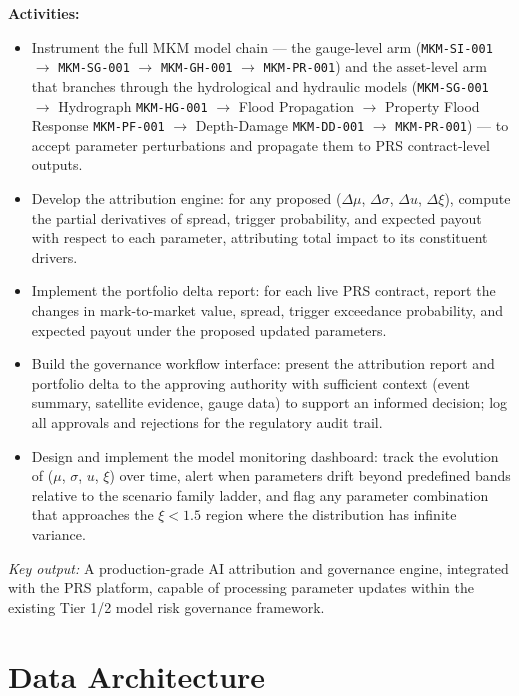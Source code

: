 \documentclass[11pt,a4paper]{article}
\begin{document}
\noindent\textbf{Activities:}
\begin{itemize}
  \item Instrument the full MKM model chain --- the gauge-level arm
  (\texttt{MKM-SI-001} $\rightarrow$ \texttt{MKM-SG-001} $\rightarrow$
  \texttt{MKM-GH-001} $\rightarrow$ \texttt{MKM-PR-001}) and the asset-level arm
  that branches through the hydrological and hydraulic models (\texttt{MKM-SG-001}
  $\rightarrow$ Hydrograph \texttt{MKM-HG-001} $\rightarrow$ Flood Propagation
  $\rightarrow$ Property Flood Response \texttt{MKM-PF-001} $\rightarrow$
  Depth-Damage \texttt{MKM-DD-001} $\rightarrow$ \texttt{MKM-PR-001}) --- to accept
  parameter perturbations and propagate them to PRS contract-level outputs.
  \item Develop the attribution engine: for any proposed ($\Delta\mu$,
  $\Delta\sigma$, $\Delta u$, $\Delta\xi$), compute the partial derivatives of
  spread, trigger probability, and expected payout with respect to each parameter,
  attributing total impact to its constituent drivers.
  \item Implement the portfolio delta report: for each live PRS contract, report
  the changes in mark-to-market value, spread, trigger exceedance probability, and
  expected payout under the proposed updated parameters.
  \item Build the governance workflow interface: present the attribution report and
  portfolio delta to the approving authority with sufficient context (event
  summary, satellite evidence, gauge data) to support an informed decision; log all
  approvals and rejections for the regulatory audit trail.
  \item Design and implement the model monitoring dashboard: track the evolution of
  ($\mu$, $\sigma$, $u$, $\xi$) over time, alert when parameters drift beyond
  predefined bands relative to the scenario family ladder, and flag any parameter
  combination that approaches the $\xi < 1.5$ region where the distribution has
  infinite variance.
\end{itemize}

\textit{Key output:} A production-grade AI attribution and governance engine,
integrated with the PRS platform, capable of processing parameter updates within
the existing Tier 1/2 model risk governance framework.

\section{Data Architecture}
\end{document}
